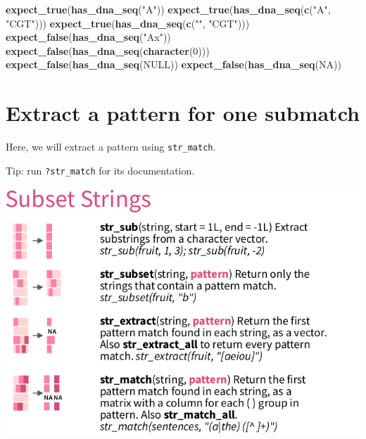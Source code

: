 \documentclass[]{book}
\newenvironment{Shaded}{}{}
\newcommand{\ControlFlowTok}[1]{\textcolor[rgb]{0.00,0.44,0.13}{\textbf{#1}}}
\newcommand{\DecValTok}[1]{\textcolor[rgb]{0.25,0.63,0.44}{#1}}
\newcommand{\KeywordTok}[1]{\textcolor[rgb]{0.00,0.44,0.13}{\textbf{#1}}}
\newcommand{\NormalTok}[1]{#1}
\newcommand{\OperatorTok}[1]{\textcolor[rgb]{0.40,0.40,0.40}{#1}}
\newcommand{\OtherTok}[1]{\textcolor[rgb]{0.00,0.44,0.13}{#1}}
\newcommand{\StringTok}[1]{\textcolor[rgb]{0.25,0.44,0.63}{#1}}
\begin{document}
\begin{Shaded}
\end{Shaded}

\begin{Shaded}
\begin{Highlighting}[]
\KeywordTok{expect_true}\NormalTok{(}\KeywordTok{has_dna_seq}\NormalTok{(}\StringTok{"A"}\NormalTok{))}
\KeywordTok{expect_true}\NormalTok{(}\KeywordTok{has_dna_seq}\NormalTok{(}\KeywordTok{c}\NormalTok{(}\StringTok{"A"}\NormalTok{, }\StringTok{"CGT"}\NormalTok{)))}
\KeywordTok{expect_true}\NormalTok{(}\KeywordTok{has_dna_seq}\NormalTok{(}\KeywordTok{c}\NormalTok{(}\StringTok{""}\NormalTok{, }\StringTok{"CGT"}\NormalTok{)))}
\KeywordTok{expect_false}\NormalTok{(}\KeywordTok{has_dna_seq}\NormalTok{(}\StringTok{"Ax"}\NormalTok{))}
\KeywordTok{expect_false}\NormalTok{(}\KeywordTok{has_dna_seq}\NormalTok{(}\KeywordTok{character}\NormalTok{(}\DecValTok{0}\NormalTok{)))}
\KeywordTok{expect_false}\NormalTok{(}\KeywordTok{has_dna_seq}\NormalTok{(}\OtherTok{NULL}\NormalTok{))}
\KeywordTok{expect_false}\NormalTok{(}\KeywordTok{has_dna_seq}\NormalTok{(}\OtherTok{NA}\NormalTok{))}
\end{Highlighting}
\end{Shaded}

\hypertarget{extract-a-pattern-for-one-submatch}{%
\section{Extract a pattern for one submatch}\label{extract-a-pattern-for-one-submatch}}

Here, we will extract a pattern using \texttt{str\_match}.

Tip: run \texttt{?str\_match} for its documentation.

\includegraphics{data/06_subset.png}
\end{document}
